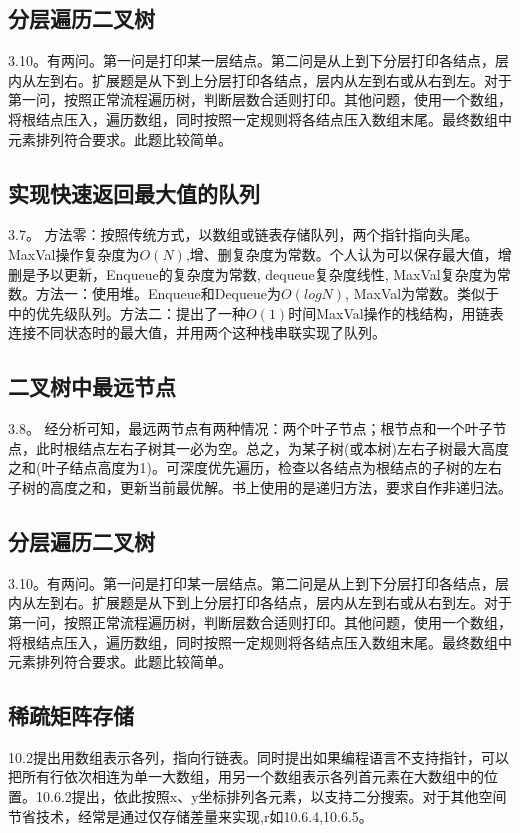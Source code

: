 \subsection{分层遍历二叉树}
\cite{bop}3.10。有两问。第一问是打印某一层结点。第二问是从上到下分层打印各结点，层内从左到右。扩展题是从下到上分层打印各结点，层内从左到右或从右到左。对于第一问，按照正常流程遍历树，判断层数合适则打印。其他问题，使用一个数组，将根结点压入，遍历数组，同时按照一定规则将各结点压入数组末尾。最终数组中元素排列符合要求。此题比较简单。


\subsection{实现快速返回最大值的队列}
\cite{bop}3.7。
方法零：按照传统方式，以数组或链表存储队列，两个指针指向头尾。MaxVal操作复杂度为$O(N)$,增、删复杂度为常数。个人认为可以保存最大值，增删是予以更新，Enqueue的复杂度为常数, dequeue复杂度线性, MaxVal复杂度为常数。方法一：使用堆。Enqueue和Dequeue为$O(logN)$, MaxVal为常数。类似于\cite{ita}中的优先级队列。方法二：\cite{bop}提出了一种$O(1)$时间MaxVal操作的栈结构，用链表连接不同状态时的最大值，并用两个这种栈串联实现了队列。

\subsection{二叉树中最远节点}
\cite{bop}3.8。
经分析可知，最远两节点有两种情况：两个叶子节点；根节点和一个叶子节点，此时根结点左右子树其一必为空。总之，为某子树(或本树)左右子树最大高度之和(叶子结点高度为1)。可深度优先遍历，检查以各结点为根结点的子树的左右子树的高度之和，更新当前最优解。书上使用的是递归方法，要求自作非递归法。

\subsection{分层遍历二叉树}
\cite{bop}3.10。有两问。第一问是打印某一层结点。第二问是从上到下分层打印各结点，层内从左到右。扩展题是从下到上分层打印各结点，层内从左到右或从右到左。对于第一问，按照正常流程遍历树，判断层数合适则打印。其他问题，使用一个数组，将根结点压入，遍历数组，同时按照一定规则将各结点压入数组末尾。最终数组中元素排列符合要求。此题比较简单。



\subsection{稀疏矩阵存储}
\cite{pp}10.2提出用数组表示各列，指向行链表。同时提出如果编程语言不支持指针，可以把所有行依次相连为单一大数组，用另一个数组表示各列首元素在大数组中的位置。\cite{pp}10.6.2提出，依此按照x、y坐标排列各元素，以支持二分搜索。对于其他空间节省技术，经常是通过仅存储差量来实现,r如\cite{pp}10.6.4,10.6.5。
\label{problem:sparseMatrix}


